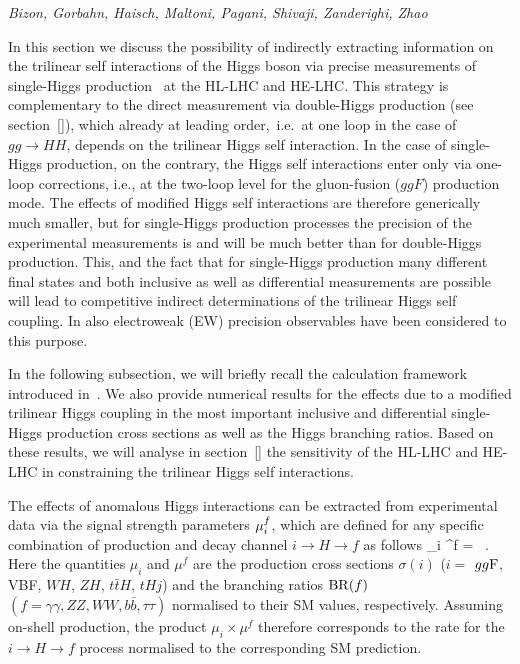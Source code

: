 \begin{center}
\textit{Bizon, Gorbahn, Haisch, Maltoni, Pagani, Shivaji, Zanderighi, Zhao}
\end{center}

In this section we discuss the possibility of indirectly extracting information on the trilinear self interactions of the Higgs boson via precise measurements of single-Higgs production~\cite{McCullough:2013rea,Gorbahn:2016uoy,Degrassi:2016wml,Bizon:2016wgr,DiVita:2017eyz,Barklow:2017awn,Maltoni:2017ims,DiVita:2017vrr,Maltoni:2018ttu} at the HL-LHC and HE-LHC. This strategy is complementary to the direct measurement via double-Higgs production (see section~\ref{}), which already at leading order,~i.e.~at one loop in the case of $gg \to HH$, depends on the trilinear Higgs self interaction. In the case of single-Higgs production, on the contrary, the Higgs self interactions enter only via one-loop corrections, i.e., at the two-loop level for the gluon-fusion ($ggF$) production mode. The effects of modified Higgs self interactions are therefore generically much smaller, but for single-Higgs production processes the precision of the experimental measurements is and will be much better than for double-Higgs production. This, and the fact that for single-Higgs production many different final states and both inclusive as well as  differential measurements are possible will lead to competitive indirect determinations of the trilinear Higgs self coupling. In \cite{Degrassi:2017ucl,Kribs:2017znd} also electroweak (EW) precision observables have been considered to this purpose.

In the following subsection, we will briefly recall the calculation framework introduced in~\cite{Gorbahn:2016uoy,Degrassi:2016wml}. We also provide  numerical results for the effects due to a modified  trilinear Higgs coupling in the most important inclusive and differential single-Higgs production cross sections as well as the Higgs branching ratios. Based on these results, we will analyse in section~\ref{} the sensitivity of the HL-LHC and HE-LHC in constraining the trilinear Higgs self interactions. 

\label{tril-single:theo}

The effects of anomalous Higgs interactions can be extracted from experimental data via the signal strength parameters $\mu_i^f$, which
are defined for any specific combination of production and decay channel $i \to H \to f$ as follows 
\be \label{signalstre}
\muif \equiv \mu_i \times \mu^f =  \times {} \, .
\ee 
Here the quantities $\mu_i$ and $\mu^f$ are   the production cross sections $\sigma(i)$ ($i=$ $gg{\rm F}$, {\rm VBF}, $WH$, $ZH$, $t \bar tH$, $tHj$) and the branching ratios ${\rm BR}(f)$ $(f= \gamma\gamma, ZZ, WW, b\bar{b}, \tau\tau)$ normalised to their SM values, respectively. Assuming on-shell production, the product $\mu_i \times \mu^f$  therefore corresponds to the rate for the $i \to H \to f$ process  normalised to the corresponding SM prediction.

